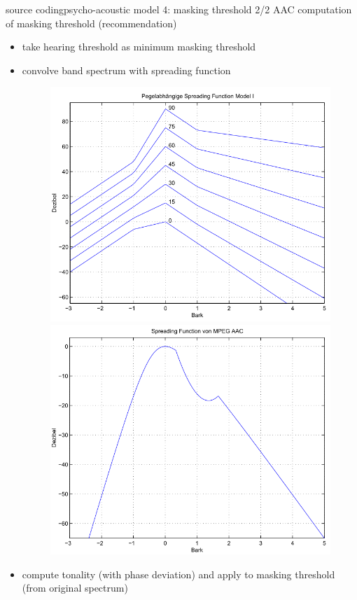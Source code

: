 	\begin{frame}{source coding}{psycho-acoustic model 4: masking threshold 2/2}
        AAC computation of masking threshold (recommendation)
        \begin{itemize}
            \item       take hearing threshold as minimum masking threshold
            \item<2->   convolve band spectrum with spreading function
                        {
                        \begin{figure}
                            \includegraphics[scale=.25]{graph/spreadingfunction_layer2}
                            \includegraphics[scale=.25]{graph/spreadingfunction_aac}
                        \end{figure}}
            \item<3->   compute tonality (with phase deviation) and apply to masking threshold (from original spectrum)
        \end{itemize}
        
	\end{frame}
	
